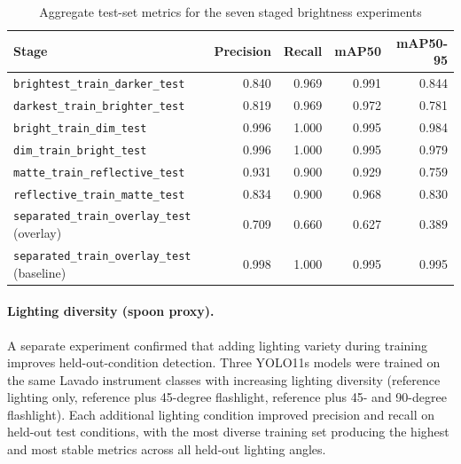 \documentclass[10pt,a4paper]{article}
\begin{document}
\begin{table}[H]
\centering
\caption{Aggregate test-set metrics for the seven staged brightness experiments}
\label{tab:brightness-stage-metrics}
\small\renewcommand{\arraystretch}{1.2}\setlength{\tabcolsep}{4pt}
\begin{tabularx}{\textwidth}{lrrrr}
\hline
Stage & Precision & Recall & mAP50 & mAP50-95 \\
\hline
\texttt{brightest\_train\_darker\_test} & 0.840 & 0.969 & 0.991 & 0.844 \\
\texttt{darkest\_train\_brighter\_test} & 0.819 & 0.969 & 0.972 & 0.781 \\
\texttt{bright\_train\_dim\_test} & 0.996 & 1.000 & 0.995 & 0.984 \\
\texttt{dim\_train\_bright\_test} & 0.996 & 1.000 & 0.995 & 0.979 \\
\texttt{matte\_train\_reflective\_test} & 0.931 & 0.900 & 0.929 & 0.759 \\
\texttt{reflective\_train\_matte\_test} & 0.834 & 0.900 & 0.968 & 0.830 \\
\texttt{separated\_train\_overlay\_test} (overlay) & 0.709 & 0.660 & 0.627 & 0.389 \\
\texttt{separated\_train\_overlay\_test} (baseline) & 0.998 & 1.000 & 0.995 & 0.995 \\
\hline
\end{tabularx}
\end{table}

\paragraph{Lighting diversity (spoon proxy).}
A separate experiment confirmed that adding lighting variety during
training improves held-out-condition detection. Three YOLO11s models
were trained on the same Lavado instrument classes with increasing
lighting diversity (reference lighting only, reference plus
45-degree flashlight, reference plus 45- and 90-degree flashlight).
Each additional lighting condition improved precision and recall
on held-out test conditions, with the most diverse training set
producing the highest and most stable metrics across all held-out
lighting angles.
\end{document}

